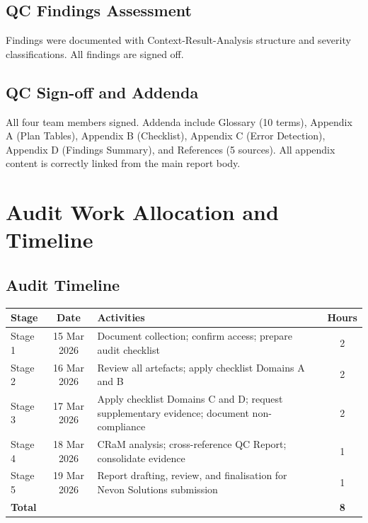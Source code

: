 \documentclass[11pt,a4paper]{article}
\begin{document}
\subsection{QC Findings Assessment}

Findings were documented with Context-Result-Analysis structure and severity classifications. All findings are signed off.

\subsection{QC Sign-off and Addenda}

All four team members signed. Addenda include Glossary (10 terms), Appendix A (Plan Tables), Appendix B (Checklist), Appendix C (Error Detection), Appendix D (Findings Summary), and References (5 sources). All appendix content is correctly linked from the main report body.

\clearpage
\renewcommand{\appendixprefix}{D}
\setcounter{page}{1}
\section{Audit Work Allocation and Timeline}
\label{app:timeline}

\subsection{Audit Timeline}

\begin{table}[H]
\centering\small
\begin{tabular}{|l|c|>{\RaggedRight\arraybackslash}m{7cm}|c|}
\hline
\rowcolor{tableheader}
\textbf{Stage} & \textbf{Date} & \textbf{Activities} & \textbf{Hours} \\\hline
Stage 1 & 15 Mar 2026 & Document collection; confirm access; prepare audit checklist & 2 \\\hline
Stage 2 & 16 Mar 2026 & Review all artefacts; apply checklist Domains A and B & 2 \\\hline
Stage 3 & 17 Mar 2026 & Apply checklist Domains C and D; request supplementary evidence; document non-compliance & 2 \\\hline
Stage 4 & 18 Mar 2026 & CRaM analysis; cross-reference QC Report; consolidate evidence & 1 \\\hline
Stage 5 & 19 Mar 2026 & Report drafting, review, and finalisation for Nevon Solutions submission & 1 \\\hline
\textbf{Total} & & & \textbf{8} \\\hline
\end{tabular}
\end{table}
\end{document}
